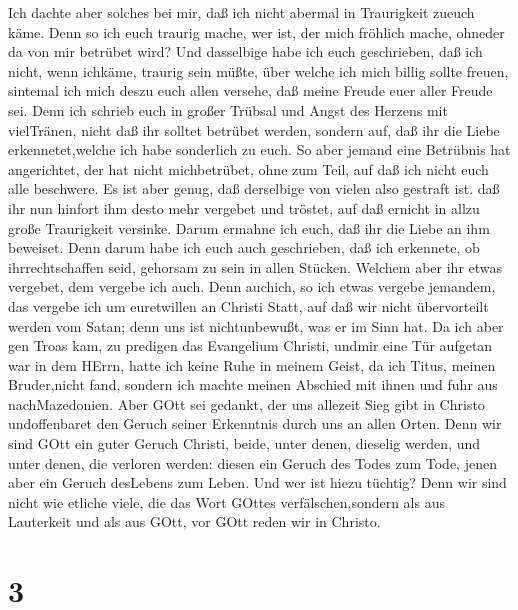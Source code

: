  Ich dachte aber solches bei mir, daß ich nicht abermal in
Traurigkeit zueuch käme.  Denn so ich euch traurig mache,
wer ist, der mich fröhlich mache, ohneder da von mir betrübet wird?
 Und dasselbige habe ich euch geschrieben, daß ich nicht,
wenn ichkäme, traurig sein müßte, über welche ich mich billig sollte
freuen, sintemal ich mich deszu euch allen versehe, daß meine Freude
euer aller Freude sei.  Denn ich schrieb euch in großer
Trübsal und Angst des Herzens mit vielTränen, nicht daß ihr solltet
betrübet werden, sondern auf, daß ihr die Liebe erkennetet,welche ich
habe sonderlich zu euch.  So aber jemand eine Betrübnis hat
angerichtet, der hat nicht michbetrübet, ohne zum Teil, auf daß ich
nicht euch alle beschwere.  Es ist aber genug, daß
derselbige von vielen also gestraft ist.  daß ihr nun
hinfort ihm desto mehr vergebet und tröstet, auf daß ernicht in allzu
große Traurigkeit versinke.  Darum ermahne ich euch, daß ihr
die Liebe an ihm beweiset.  Denn darum habe ich euch auch
geschrieben, daß ich erkennete, ob ihrrechtschaffen seid, gehorsam zu
sein in allen Stücken.  Welchem aber ihr etwas vergebet,
dem vergebe ich auch. Denn auchich, so ich etwas vergebe jemandem, das
vergebe ich um euretwillen an Christi Statt,  auf daß wir
nicht übervorteilt werden vom Satan; denn uns ist nichtunbewußt, was er
im Sinn hat.  Da ich aber gen Troas kam, zu predigen das
Evangelium Christi, undmir eine Tür aufgetan war in dem HErrn,
 hatte ich keine Ruhe in meinem Geist, da ich Titus, meinen
Bruder,nicht fand, sondern ich machte meinen Abschied mit ihnen und fuhr
aus nachMazedonien.  Aber GOtt sei gedankt, der uns
allezeit Sieg gibt in Christo undoffenbaret den Geruch seiner Erkenntnis
durch uns an allen Orten.  Denn wir sind GOtt ein guter
Geruch Christi, beide, unter denen, dieselig werden, und unter denen,
die verloren werden:  diesen ein Geruch des Todes zum Tode,
jenen aber ein Geruch desLebens zum Leben. Und wer ist hiezu tüchtig?
 Denn wir sind nicht wie etliche viele, die das Wort GOttes
verfälschen,sondern als aus Lauterkeit und als aus GOtt, vor GOtt reden
wir in Christo.

\hypertarget{section-2}{%
\section{3}\label{section-2}}


